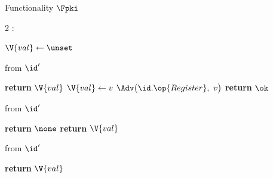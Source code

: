 \begin{interface}[nofloat]{Functionality $\Fpki$ \\
}

{\scriptsize
\setlength{\columnsep}{1.4em}
\begin{multicols}{2}
:
\begin{algorithmic}[1]
\setcounter{contline}{0}\algcont
\State $\V{val} \gets \unset$
\algsave
\end{algorithmic}
\vspace{1.4ex}

 \quad from $\id'$
\begin{algorithmic}[1]
\algcont
{}
  \State \textbf{return} $\V{val}$ \label{ln:pkilocpeek}
\EndIf
{} \label{ln:pkilocfirst}
\State $\V{val} \gets v$ \label{ln:pkilocwrite}
\State $\Adv\bigl(\id.\op{Register},\ v\bigr)$ \label{ln:pkilocnotify}
\State \textbf{return} $\ok$
\algsave
\end{algorithmic}
\vspace{1.4ex}

\columnbreak

 \quad from $\id'$
\begin{algorithmic}[1]
\algcont
{}
  \State \textbf{return} $\none$ \label{ln:pkilocnone}
\EndIf
\State \textbf{return} $\V{val}$ \label{ln:pkilocsame}
\algsave
\end{algorithmic}
\vspace{1.4ex}

 \quad from $\id'$
\begin{algorithmic}[1]
\algcont
\State \textbf{return} $\V{val}$ \label{ln:pkilocleak}
\algsave
\end{algorithmic}
\end{multicols}}
\end{interface}
